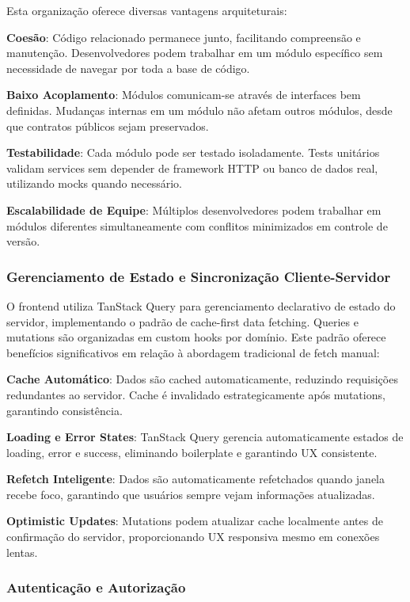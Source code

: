 \documentclass[nonacm, sigconf]{acmart}
\begin{document}
Esta organização oferece diversas vantagens arquiteturais:

\textbf{Coesão}: Código relacionado permanece junto, facilitando compreensão e manutenção. Desenvolvedores podem trabalhar em um módulo específico sem necessidade de navegar por toda a base de código.

\textbf{Baixo Acoplamento}: Módulos comunicam-se através de interfaces bem definidas. Mudanças internas em um módulo não afetam outros módulos, desde que contratos públicos sejam preservados.

\textbf{Testabilidade}: Cada módulo pode ser testado isoladamente. Tests unitários validam services sem depender de framework HTTP ou banco de dados real, utilizando mocks quando necessário.

\textbf{Escalabilidade de Equipe}: Múltiplos desenvolvedores podem trabalhar em módulos diferentes simultaneamente com conflitos minimizados em controle de versão.

\subsubsection{Gerenciamento de Estado e Sincronização Cliente-Servidor}

O frontend utiliza TanStack Query para gerenciamento declarativo de estado do servidor, implementando o padrão de cache-first data fetching. Queries e mutations são organizadas em custom hooks por domínio. Este padrão oferece benefícios significativos em relação à abordagem tradicional de fetch manual:

\textbf{Cache Automático}: Dados são cached automaticamente, reduzindo requisições redundantes ao servidor. Cache é invalidado estrategicamente após mutations, garantindo consistência.

\textbf{Loading e Error States}: TanStack Query gerencia automaticamente estados de loading, error e success, eliminando boilerplate e garantindo UX consistente.

\textbf{Refetch Inteligente}: Dados são automaticamente refetchados quando janela recebe foco, garantindo que usuários sempre vejam informações atualizadas.

\textbf{Optimistic Updates}: Mutations podem atualizar cache localmente antes de confirmação do servidor, proporcionando UX responsiva mesmo em conexões lentas.

\subsubsection{Autenticação e Autorização}
\end{document}
